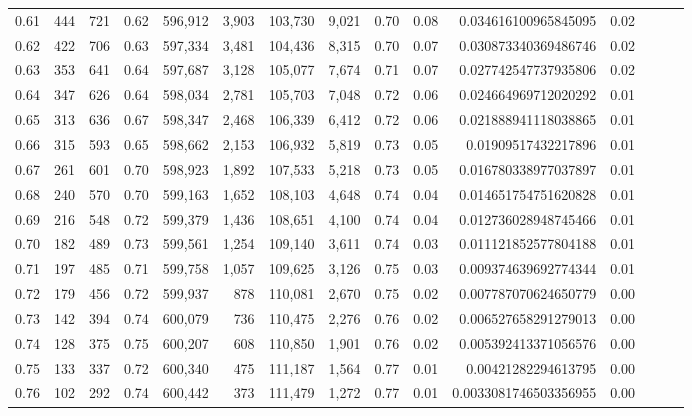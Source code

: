 \begin{tabular}{rrrrrrrrrrrrrrr}
0.61 &     444 &    721 &  0.62 &  596,912 &    3,903 &  103,730 &    9,021 &  0.70 &  0.08 &    0.034616100965845095 &      0.02 \\
0.62 &     422 &    706 &  0.63 &  597,334 &    3,481 &  104,436 &    8,315 &  0.70 &  0.07 &    0.030873340369486746 &      0.02 \\
0.63 &     353 &    641 &  0.64 &  597,687 &    3,128 &  105,077 &    7,674 &  0.71 &  0.07 &    0.027742547737935806 &      0.02 \\
0.64 &     347 &    626 &  0.64 &  598,034 &    2,781 &  105,703 &    7,048 &  0.72 &  0.06 &    0.024664969712020292 &      0.01 \\
0.65 &     313 &    636 &  0.67 &  598,347 &    2,468 &  106,339 &    6,412 &  0.72 &  0.06 &    0.021888941118038865 &      0.01 \\
0.66 &     315 &    593 &  0.65 &  598,662 &    2,153 &  106,932 &    5,819 &  0.73 &  0.05 &     0.01909517432217896 &      0.01 \\
0.67 &     261 &    601 &  0.70 &  598,923 &    1,892 &  107,533 &    5,218 &  0.73 &  0.05 &    0.016780338977037897 &      0.01 \\
0.68 &     240 &    570 &  0.70 &  599,163 &    1,652 &  108,103 &    4,648 &  0.74 &  0.04 &    0.014651754751620828 &      0.01 \\
0.69 &     216 &    548 &  0.72 &  599,379 &    1,436 &  108,651 &    4,100 &  0.74 &  0.04 &    0.012736028948745466 &      0.01 \\
0.70 &     182 &    489 &  0.73 &  599,561 &    1,254 &  109,140 &    3,611 &  0.74 &  0.03 &    0.011121852577804188 &      0.01 \\
0.71 &     197 &    485 &  0.71 &  599,758 &    1,057 &  109,625 &    3,126 &  0.75 &  0.03 &    0.009374639692774344 &      0.01 \\
0.72 &     179 &    456 &  0.72 &  599,937 &      878 &  110,081 &    2,670 &  0.75 &  0.02 &    0.007787070624650779 &      0.00 \\
0.73 &     142 &    394 &  0.74 &  600,079 &      736 &  110,475 &    2,276 &  0.76 &  0.02 &    0.006527658291279013 &      0.00 \\
0.74 &     128 &    375 &  0.75 &  600,207 &      608 &  110,850 &    1,901 &  0.76 &  0.02 &    0.005392413371056576 &      0.00 \\
0.75 &     133 &    337 &  0.72 &  600,340 &      475 &  111,187 &    1,564 &  0.77 &  0.01 &     0.00421282294613795 &      0.00 \\
0.76 &     102 &    292 &  0.74 &  600,442 &      373 &  111,479 &    1,272 &  0.77 &  0.01 &   0.0033081746503356955 &      0.00 \\

\end{tabular}

